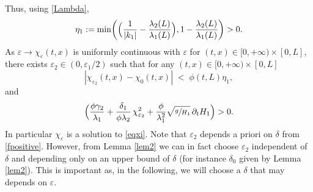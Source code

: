 \documentclass[11pt]{article}
\numberwithin{equation}{section}
\theoremstyle{definition}
\begin{document}
Thus, using \eqref{Lambda},
\begin{equation}
\label{defeta1}
\eta_{1}:=\min \biggl(\Bigl(\frac{1}{|k_{1}|}-\frac{\lambda_{2}(L)}{\lambda_{1}(L)} \Bigr),1-\frac{\lambda_{2}(L)}{\lambda_{1}(L)} \biggr)>0.
\end{equation}
As $\varepsilon\to \chi_{\varepsilon}(t,x)$ is uniformly continuous with $\varepsilon$ for $(t,x)\in[0,{+}\infty)\times[0,L]$,
there exists
$\varepsilon_{2}\in(0,\varepsilon_{1}/2)$ such that
for any $(t,x)\in[0,{+}\infty)\times[0,L]$
\begin{equation}
|\chi_{\varepsilon_{2}}(t,x)-\chi_{0}(t,x)| \;{<}\; \phi(t,L)\eta_{1},
\label{fL}
\end{equation}
and
\begin{equation}
\Bigl(\frac{\phi\gamma_{2}}{\lambda_{1}}+\frac{\delta_{1}}{\phi\lambda_{2}}\,\chi_{\varepsilon_{2}}^{2}+{\frac{\phi}{\lambda_{1}^{2}}}\sqrt{\sfrac{g}{H_{1}}}\,\partial_{t} H_{1} \Bigr)>0.
\label{fpositive}
\end{equation}
{In particular $\chi_{\varepsilon}$ is a solution to \eqref{eqxi}.}
Note that $\varepsilon_{2}$ depends a priori on $\delta$ from \eqref{fpositive}. However, from Lemma \ref{lem2}
we can in fact choose $\varepsilon_{2}$ independent of $\delta$ and depending only on an upper bound of $\delta$ (for instance $\delta_{0}$ given by Lemma \ref{lem2}). This is important as, in the following,
we will choose
a $\delta$ that may depends on $\varepsilon$.
\end{document}
